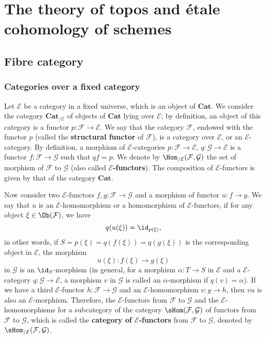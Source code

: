 \chapter{The theory of topos and \'etale cohomology of schemes}
\section{Fibre category}\label{fibre cat category section}
\subsection{Categories over a fixed category}\label{fibre cat E-category subsection}
Let $\mathcal{E}$ be a category in a fixed universe, which is an object of $\mathbf{Cat}$. We consider the category $\mathbf{Cat}_{/\mathcal{E}}$ of objects of $\mathbf{Cat}$ lying over $\mathcal{E}$; by definition, an object of this category is a functor $p:\mathcal{F}\to \mathcal{E}$. We say that the category $\mathcal{F}$, endowed with the functor $p$ (called the \textbf{structural functor} of $\mathcal{F}$), is a category over $\mathcal{E}$, or an $\mathcal{E}$-category. By definition, a morphism of $\mathcal{E}$-categories $p:\mathcal{F}\to \mathcal{E}$, $q:\mathcal{G}\to \mathcal{E}$ is a functor $f:\mathcal{F}\to \mathcal{G}$ such that $qf=p$. We denote by $\Hom_{/\mathcal{E}}(\mathcal{F},\mathcal{G})$ the set of morphism of $\mathcal{F}$ to $\mathcal{G}$ (also called \textbf{$\mathcal{E}$-functors}). The composition of $\mathcal{E}$-functors is given by that of the category $\mathbf{Cat}$.\par
Now consider two $\mathcal{E}$-functors $f,g:\mathcal{F}\to \mathcal{G}$ and a morphism of functor $u:f\to g$. We say that $u$ is an $\mathcal{E}$-homomorphism or a homomorphism of $\mathcal{E}$-functors, if for any object $\xi\in\Ob(\mathcal{F})$, we have
\[q(u(\xi))=\id_{p(\xi)},\]
in other words, if $S=p(\xi)=q(f(\xi))=q(g(\xi))$ is the corresponding object in $\mathcal{E}$, the morphism
\[u(\xi):f(\xi)\to g(\xi)\]
in $\mathcal{G}$ is an $\id_S$-morphism (in general, for a morphism $\alpha:T\to S$ in $\mathcal{E}$ and a $\mathcal{E}$-category $q:\mathcal{G}\to \mathcal{E}$, a morphism $v$ in $\mathcal{G}$ is called an $\alpha$-morphism if $q(v)=\alpha$). If we have a third $\mathcal{E}$-functor $h:\mathcal{F}\to \mathcal{G}$ and an $\mathcal{E}$-homomorphism $v:g\to h$, then $vu$ is also an $\mathcal{E}$-morphism. Therefore, the $\mathcal{E}$-functors from $\mathcal{F}$ to $\mathcal{G}$ and the $\mathcal{E}$-homomorphisms  for a subcategory of the category $\sHom(\mathcal{F},\mathcal{G})$ of functors from $\mathcal{F}$ to $\mathcal{G}$, which is called the \textbf{category of $\mathcal{E}$-functors} from $\mathcal{F}$ to $\mathcal{G}$, denoted by $\sHom_{/\mathcal{E}}(\mathcal{F},\mathcal{G})$.\par
